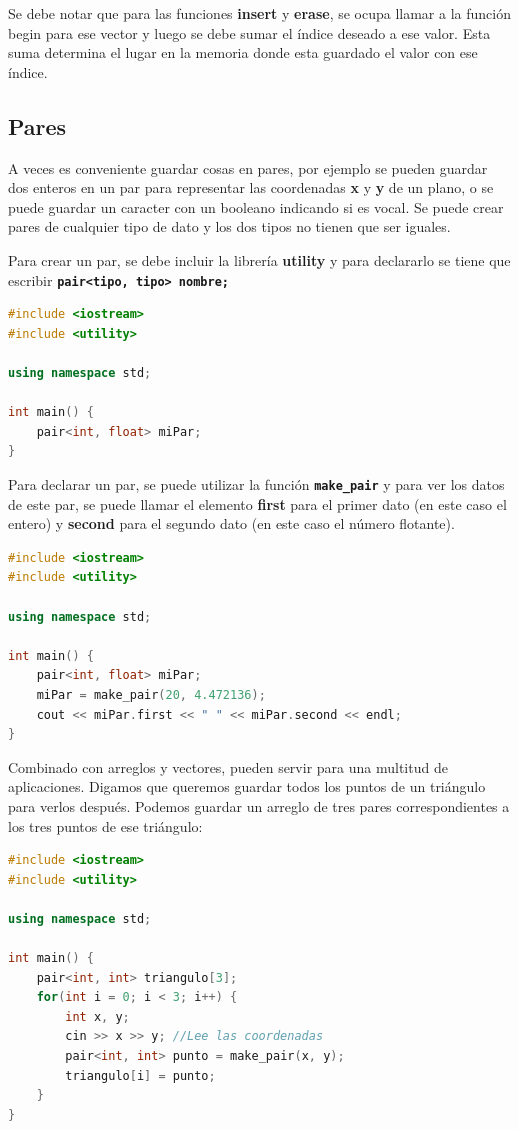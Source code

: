 \documentclass{article}
\begin{document}
Se debe notar que para las funciones \textbf{insert} y \textbf{erase}, se ocupa llamar a la función begin para ese vector y luego se debe sumar el índice deseado a ese valor. Esta suma determina el lugar en la memoria donde esta guardado el valor con ese índice.

\subsection{Pares}

A veces es conveniente guardar cosas en pares, por ejemplo se pueden guardar dos enteros en un par para representar las coordenadas \textbf{x} y \textbf{y} de un plano, o se puede guardar un caracter con un booleano indicando si es vocal. Se puede crear pares de cualquier tipo de dato y los dos tipos no tienen que ser iguales.

Para crear un par, se debe incluir la librería \textbf{utility} y para declararlo se tiene que escribir \textbf{\lstinline{pair<tipo, tipo> nombre;}}

\begin{lstlisting}[language=C++, title=Declarando pares]
#include <iostream>
#include <utility>

using namespace std;

int main() {
	pair<int, float> miPar;
}
\end{lstlisting}

Para declarar un par, se puede utilizar la función \textbf{\lstinline{make_pair}} y para ver los datos de este par, se puede llamar el elemento \textbf{first} para el primer dato (en este caso el entero) y \textbf{second} para el segundo dato (en este caso el número flotante).

\begin{lstlisting}[language=C++, title=Declarando pares]
#include <iostream>
#include <utility>

using namespace std;

int main() {
	pair<int, float> miPar;
	miPar = make_pair(20, 4.472136);
	cout << miPar.first << " " << miPar.second << endl;
}
\end{lstlisting}

Combinado con arreglos y vectores, pueden servir para una multitud de aplicaciones. Digamos que queremos guardar todos los puntos de un triángulo para verlos después. Podemos guardar un arreglo de tres pares correspondientes a los tres puntos de ese triángulo:

\begin{lstlisting}[language=C++, title=Arreglo de pares]
#include <iostream>
#include <utility>

using namespace std;

int main() {
	pair<int, int> triangulo[3];
	for(int i = 0; i < 3; i++) {
		int x, y;
		cin >> x >> y; //Lee las coordenadas
		pair<int, int> punto = make_pair(x, y);
		triangulo[i] = punto;
	}
}
\end{lstlisting}
\end{document}

